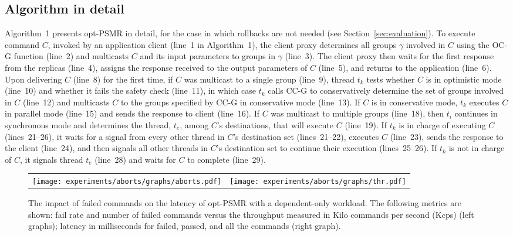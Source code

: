 \documentclass[conference]{IEEEtran}
\newcommand{\sizefactor}{0.9}
\begin{document}
\subsection{Algorithm in detail}
\label{sec:alg}

Algorithm~1 presents opt-PSMR in detail, for the case in which rollbacks are not needed (see Section~\ref{sec:evaluation}).
To execute command $C$, invoked by an application client (line~1 in Algorithm~1), the client proxy determines all groups $\gamma$ involved in $C$ using the OC-G function (line~2) and multicasts $C$ and its input parameters to groups in $\gamma$ (line~3). 
The client proxy then waits for the first response from the replicas (line~4), assigns the response received to the output parameters of $C$ (line~5), and returns to the application (line~6). 
Upon delivering $C$ (line~8) for the first time, if $C$ was multicast to a single group (line~9), thread $t_k$ tests whether $C$ is in optimistic mode (line~10) and whether it fails the safety check (line~11), in which case $t_k$ calls CC-G to conservatively determine the set of groups involved in $C$ (line~12) and multicasts $C$ to the groups specified by CC-G  in conservative mode (line~13).
If $C$ is in conservative mode, $t_k$ executes $C$ in parallel mode (line~15) and sends the response to client (line~16). 
If $C$ was multicast to multiple groups (line~18), then $t_i$ continues in synchronous mode and determines the thread, $t_e$, among $C$'s destinations, that will execute $C$ (line~19). 
If $t_k$ is in charge of executing $C$ (lines~21--26), it waits for a signal from every other thread in $C$'s destination set (lines~21--22), executes $C$ (line~23), sends the response to the client (line~24), and then signals all other threads in $C$'s destination set to continue their execution (lines~25--26). 
If $t_k$ is not in charge of $C$, it signals thread $t_e$ (line~28) and waits for $C$ to complete (line~29).

\begin{figure*}[t]
  \begin{center}
    \begin{tabular}{cc}
      \texttt{[image: experiments/aborts/graphs/aborts.pdf]}&
       \texttt{[image: experiments/aborts/graphs/thr.pdf]}\\
    \end{tabular}
    \caption{The impact of failed commands on the latency of opt-PSMR with a dependent-only workload. The following metrics are shown: fail rate and number of failed commands versus the throughput measured in Kilo commands per second (Kcps) (left graphs); latency in milliseconds for failed, passed, and all the commands (right graph).}
    \vspace{-5mm}
    \label{fig:aborts-latency}
 \end{center}
\end{figure*}
\end{document}
